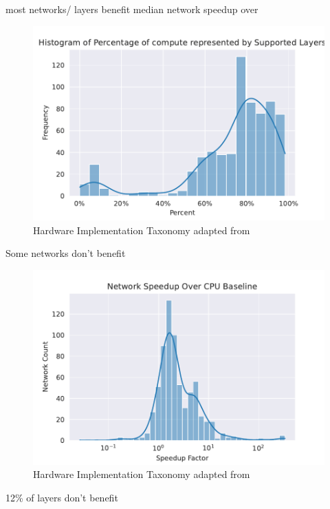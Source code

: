 most networks/ layers benefit
median network speedup over 

\begin{figure}[ht]
    \centering
    \includegraphics[scale=0.58]{Plots/overview/percent.pdf}
    \caption{Hardware Implementation Taxonomy adapted from \cite{maestro}}
    \label{fig:hw_taxonomy}
\end{figure}

Some networks don't benefit

\begin{figure}[ht]
    \centering
    \includegraphics[scale=0.58]{Plots/latency/net_speedup.pdf}
    \caption{Hardware Implementation Taxonomy adapted from \cite{maestro}}
    \label{fig:hw_taxonomy}
\end{figure}

12\% of layers don't benefit

